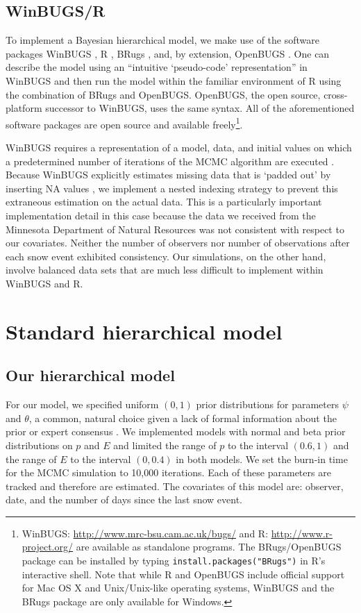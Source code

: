 \documentclass[12pt]{article}
\begin{document}
    \subsection{WinBUGS/R}
    To implement a Bayesian hierarchical model, we make use of the software
    packages WinBUGS \cite{Lunn2000}, R \cite{R2009}, BRugs \cite{Thomas2008},
    and, by extension, OpenBUGS \cite{Thomas2006}. One can describe the model
    using an ``intuitive `pseudo-code' representation'' in WinBUGS
    \cite{MacKenzie2006} and then run the model within the familiar environment
    of R using the combination of BRugs and OpenBUGS. OpenBUGS, the open source,
    cross-platform successor to WinBUGS, uses the same syntax. All of the
    aforementioned software packages are open source and available
    freely\footnote{WinBUGS: \url{http://www.mrc-bsu.cam.ac.uk/bugs/} and R:
    \url{http://www.r-project.org/} are available as standalone programs. The
    BRugs/OpenBUGS package can be installed by typing
    \texttt{install.packages("BRugs")} in R's interactive shell. Note that while
    R and OpenBUGS include official support for Mac OS X and Unix/Unix-like
    operating systems, WinBUGS and the BRugs package are only available for
    Windows.}.

    WinBUGS requires a representation of a model, data, and initial values on
    which a predetermined number of iterations of the MCMC algorithm are
    executed \cite{MacKenzie2006}. Because WinBUGS explicitly estimates missing
    data that is `padded out' by inserting NA values \cite{Spiegelhalter2003},
    we implement a nested indexing strategy to prevent this extraneous
    estimation on the actual data. This is a particularly important
    implementation detail in this case because the data we received from the
    Minnesota Department of Natural Resources was not consistent with respect to
    our covariates. Neither the number of observers nor number of observations
    after each snow event exhibited consistency. Our simulations, on the other
    hand, involve balanced data sets that are much less difficult to implement
    within WinBUGS and R.

\section{Standard hierarchical model}

    \subsection{Our hierarchical model}
    For our model, we specified uniform \((0, 1)\) prior distributions for
    parameters \(\psi\) and \(\theta\), a common, natural choice given a lack of
    formal information about the prior or expert consensus \cite{MacKenzie2006}.
    We implemented models with normal and beta prior distributions on \(p\) and
    \(E\) and limited the range of \(p\) to the interval \((0.6, 1)\) and the
    range of \(E\) to the interval \((0, 0.4)\) in both models. We set the
    burn-in time for the MCMC simulation to 10,000 iterations. Each of these
    parameters are tracked and therefore are estimated. The covariates of this
    model are: observer, date, and the number of days since the last snow event.
\end{document}
